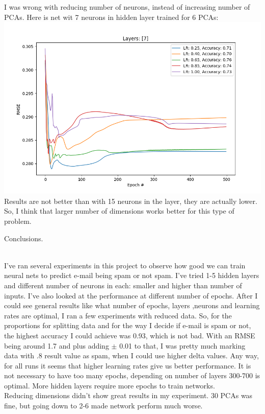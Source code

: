 \documentclass[12pt, letterpaper]{article}
\begin{document}
\begin{enumerate}[label=\Roman*.]
	     I was wrong with reducing number of neurons, instead of increasing number of PCAs. Here is net wit 7 neurons in hidden layer trained for 6 PCAs:
	     {\center \includegraphics[scale=0.6]{../images/pca_rmse_16.png} \\}
	     Results are not better than with 15 neurons in the layer, they are actually lower. So, I think that larger number of dimensions works better for this type of problem.
	     
	{\bf \item Conclusions.}\\
	
	I've ran several experiments in this project to observe how good we can train neural nets to predict e-mail being spam or not spam. I've tried 1-5 hidden layers and different number of neurons in each: smaller and higher than number of inputs. I've also looked at the performance at different number of epochs. After I could see general results like what number of epochs, layers ,neurons and learning rates are optimal, I ran a few experiments with reduced data. So, for the proportions for splitting data and for the way I decide if e-mail is spam or not, the highest accuracy I could achieve was 0.93, which is not bad. With an RMSE being around 1.7 and plus adding \( \pm \) 0.01 to that, I was pretty much marking data with .8 result value as spam, when I could use higher delta values. Any way, for all runs it seems that higher learning rates give us better performance. It is not necessary to have too many epochs, depending on number of layers 300-700 is optimal. More hidden layers require more epochs to train networks. \\
	Reducing dimensions didn't show great results in my experiment. 30 PCAs was fine, but going down to 2-6 made network perform much worse. \\
	
\end{enumerate}
\end{document}
